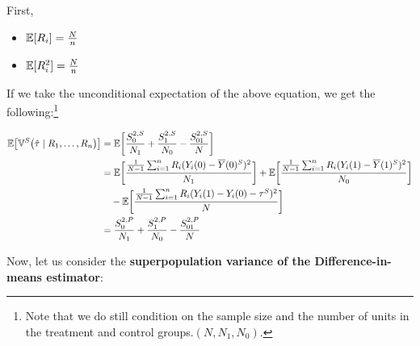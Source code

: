 First, 
\begin{itemize}
    \item ${\mathbb{E}}[R_i] = \frac{N}{n}$
    \item ${\mathbb{E}}[R_i^2] = \frac{N}{n}$
\end{itemize}

If we take the unconditional expectation of the above equation, we get the following:\footnote{Note that we do still condition on the sample size and the number of units in the treatment and control groups.$(N, N_1, N_0)$.}

\begin{align}
    {\mathbb{E}}\bigl[{\mathbb{V}}^S\bigl(\hat\tau \mid R_1, \dots, R_n\bigr)\bigr] &= {\mathbb{E}}\biggl[\frac{S_0^{2,S}}{N_1} + \frac{S_1^{2,S}}{N_0} - \frac{S_{01}^{2,S}}{N}\biggr] \\
    &= {\mathbb{E}}\biggl[\frac{\frac{1}{N-1}\sum_{i=1}^n R_i(Y_i(0) - \overline{Y}({0})^S)^2}{N_1}\biggr] + {\mathbb{E}}\biggl[\frac{\frac{1}{N-1}\sum_{i=1}^n R_i(Y_i(1) - \overline{Y}({1})^S)^2}{N_0}\biggr]\notag \\
    &\quad - {\mathbb{E}}\biggl[\frac{\frac{1}{N-1}\sum_{i=1}^n R_i(Y_i(1) - Y_i(0) - \tau^S)^2}{N}\biggr] \\
    &= \frac{S_0^{2,P}}{N_1} + \frac{S_1^{2,P}}{N_0} - \frac{S_{01}^{2,P}}{N}
\end{align}


Now, let us consider the \textbf{superpopulation variance of the Difference-in-means estimator}:

